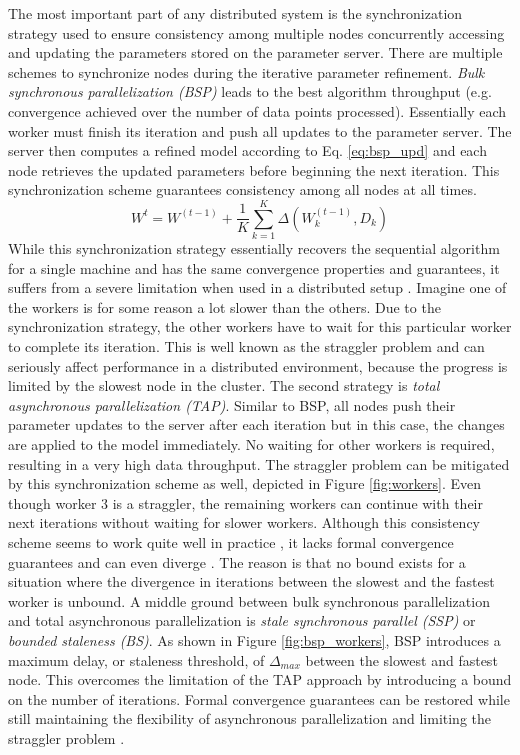 The most important part of any distributed system is the synchronization strategy used to ensure consistency among multiple nodes concurrently accessing and updating the parameters stored on the parameter server. There are multiple schemes to synchronize nodes during the iterative parameter refinement. \textit{Bulk synchronous parallelization (BSP)} leads to the best algorithm throughput (e.g. convergence achieved over the number of data points processed). Essentially each worker must finish its iteration and push all updates to the parameter server. The server then computes a refined model according to Eq. \ref{eq:bsp_upd} and each node retrieves the updated parameters before beginning the next iteration. This synchronization scheme guarantees consistency among all nodes at all times.
\begin{equation}
W^{t} = W^{(t-1)} + \frac{1}{K}\sum_{k=1}^{K}\Delta(W^{(t-1)}_{k}, D_{k})
\label{eq:bsp_upd}
\end{equation}
While this synchronization strategy essentially recovers the sequential algorithm for a single machine and has the same convergence properties and guarantees, it suffers from a severe limitation when used in a distributed setup \cite{langford2009slow}. Imagine one of the workers is for some reason a lot slower than the others. Due to the synchronization strategy, the other workers have to wait for this particular worker to complete its iteration. This is well known as the straggler problem \cite{ananthanarayanan2013effective} and can seriously affect performance in a distributed environment, because the progress is limited by the slowest node in the cluster.
The second strategy is \textit{total asynchronous parallelization (TAP)}. Similar to BSP, all nodes push their parameter updates to the server after each iteration but in this case, the changes are applied to the model immediately. No waiting for other workers is required, resulting in a very high data throughput. The straggler problem can be mitigated by this synchronization scheme as well, depicted in Figure \ref{fig:workers}. Even though worker 3 is a straggler, the remaining workers can continue with their next iterations without waiting for slower workers. Although this consistency scheme seems to work quite well in practice \cite{li2014scaling}, it lacks formal convergence guarantees and can even diverge \cite{dai2014high}. The reason is that no bound exists for a situation where the divergence in iterations between the slowest and the fastest worker is unbound.
A middle ground between bulk synchronous parallelization and total asynchronous parallelization is \textit{stale synchronous parallel (SSP)} \cite{ho2013more} or \textit{bounded staleness (BS)}. As shown in Figure \ref{fig:bsp_workers}, BSP introduces a maximum delay, or staleness threshold, of $\Delta_{max}$ between the slowest and fastest node. This overcomes the limitation of the TAP approach by introducing a bound on the number of iterations. Formal convergence guarantees can be restored while still maintaining the flexibility of asynchronous parallelization and limiting the straggler problem \cite{cipar2013solving}.
